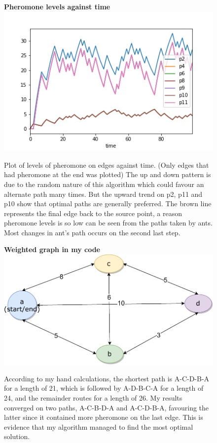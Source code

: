 \documentclass[12pt,a4paper]{article}
\begin{document}
\begin{figure}[h]
   \centering
   \textbf{Pheromone levels against time}
   \includegraphics[width=\linewidth]{notEverything.png} 
   \caption{Plot of levels of pheromone on edges against time. (Only edges that had pheromone at the end was plotted) The up and down pattern is due to the random nature of this algorithm which could favour an alternate path many times. But the upward trend on p2, p11 and p10 show that optimal paths are generally preferred. The brown line represents the final edge back to the source point, a reason pheromone levels is so low can be seen from the paths taken by ants. Most changes in ant's path occurs on the second last step.}
   \label{fig:he_who_shall_not_be_named}
\end{figure}

\begin{figure}[h]
   \centering
   \textbf{Weighted graph in my code}
   \includegraphics[width=\linewidth]{diagram.pdf} 
   \caption{According to my hand calculations, the shortest path is A-C-D-B-A for a length of 21, which is followed by A-D-B-C-A for a length of 24, and the remainder routes for a length of 26. My results converged on two paths, A-C-B-D-A and A-C-D-B-A, favouring the latter since it contained more pheromone on the last edge. This is evidence that my algorithm managed to find the most optimal solution.}
   \label{fig:i_am_voldemort}
\end{figure}
\end{document}
